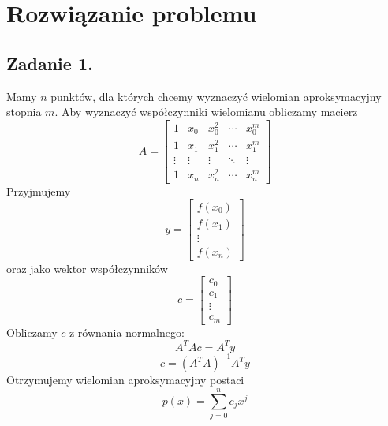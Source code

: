 \documentclass[11pt]{scrartcl}
\begin{document}
    \section{Rozwiązanie problemu}
    \subsection{Zadanie 1.}
    Mamy $n$ punktów, dla których chcemy wyznaczyć wielomian
    aproksymacyjny stopnia $m$. Aby wyznaczyć współczynniki wielomianu
    obliczamy macierz
    \[
        A=
        \begin{bmatrix}
            1 & x_0 & x_0^2 & \cdots & x_0^m \\
            1 & x_1 & x_1^2 & \cdots & x_1^m \\
            \vdots & \vdots & \vdots & \ddots & \vdots \\
            1 & x_n & x_n^2 & \cdots & x_n^m
        \end{bmatrix}
    \]
    Przyjmujemy
    \[
        y=
        \begin{bmatrix}
            f(x_0) \\
            f(x_1) \\
            \vdots \\
            f(x_n)
        \end{bmatrix}
    \]
    oraz jako wektor współczynników
    \[
        c=
        \begin{bmatrix}
            c_0 \\
            c_1 \\
            \vdots \\
            c_m
        \end{bmatrix}
    \]
    Obliczamy $c$ z równania normalnego:
    \[
        A^TAc=A^Ty
    \]
    \[
        c=(A^TA)^{-1}A^Ty
    \]
    Otrzymujemy wielomian aproksymacyjny postaci
    \[
        p(x)=\sum_{j=0}^{n}c_jx^j
    \]
\end{document}
